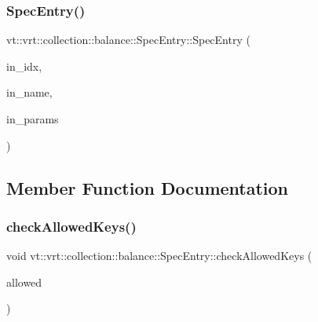 \subsubsection{\texorpdfstring{Spec\+Entry()}{SpecEntry()}}
{\footnotesize\ttfamily vt\+::vrt\+::collection\+::balance\+::\+Spec\+Entry\+::\+Spec\+Entry (\begin{DoxyParamCaption}\item[{\hyperlink{namespacevt_1_1vrt_1_1collection_1_1balance_a72a5e0d9936ddf57f8e6c64e0e9fd123}{Spec\+Index} const}]{in\+\_\+idx,  }\item[{std\+::string const}]{in\+\_\+name,  }\item[{\hyperlink{structvt_1_1vrt_1_1collection_1_1balance_1_1_spec_entry_a2ec68beff648a236f7f527dc5deeb4c5}{Param\+Map\+Type}}]{in\+\_\+params }\end{DoxyParamCaption})\hspace{0.3cm}{\ttfamily [inline]}}



\subsection{Member Function Documentation}
\mbox{\label{structvt_1_1vrt_1_1collection_1_1balance_1_1_spec_entry_a86ea05b64615f7be99e8db3baf195aae}} 
\subsubsection{\texorpdfstring{check\+Allowed\+Keys()}{checkAllowedKeys()}}
{\footnotesize\ttfamily void vt\+::vrt\+::collection\+::balance\+::\+Spec\+Entry\+::check\+Allowed\+Keys (\begin{DoxyParamCaption}\item[{std\+::vector$<$ std\+::string $>$ const \&}]{allowed }\end{DoxyParamCaption})\hspace{0.3cm}{\ttfamily [inline]}}

\mbox{\label{structvt_1_1vrt_1_1collection_1_1balance_1_1_spec_entry_a665d82dc37723e5392d215973eb1e73b}} 
